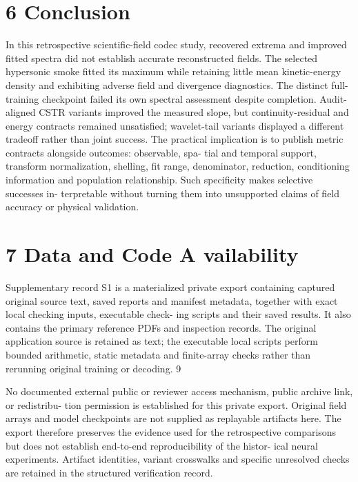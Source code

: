 \documentclass[11pt]{article}
\begin{document}
\section*{6 Conclusion}

In this retrospective scientific-field codec study, recovered extrema and improved fitted spectra did
not establish accurate reconstructed fields. The selected hypersonic smoke fitted its maximum while
retaining little mean kinetic-energy density and exhibiting adverse field and divergence diagnostics.
The distinct full-training checkpoint failed its own spectral assessment despite completion. Audit-
aligned CSTR variants improved the measured slope, but continuity-residual and energy contracts
remained unsatisfied; wavelet-tail variants displayed a different tradeoff rather than joint success.
The practical implication is to publish metric contracts alongside outcomes: observable, spa-
tial and temporal support, transform normalization, shelling, fit range, denominator, reduction,
conditioning information and population relationship. Such specificity makes selective successes in-
terpretable without turning them into unsupported claims of field accuracy or physical validation.

\section*{7 Data and Code A vailability}

Supplementary record S1 is a materialized private export containing captured original source text,
saved reports and manifest metadata, together with exact local checking inputs, executable check-
ing scripts and their saved results. It also contains the primary reference PDFs and inspection
records. The original application source is retained as text; the executable local scripts perform
bounded arithmetic, static metadata and finite-array checks rather than rerunning original training
or decoding.
9

No documented external public or reviewer access mechanism, public archive link, or redistribu-
tion permission is established for this private export. Original field arrays and model checkpoints
are not supplied as replayable artifacts here. The export therefore preserves the evidence used
for the retrospective comparisons but does not establish end-to-end reproducibility of the histor-
ical neural experiments. Artifact identities, variant crosswalks and specific unresolved checks are
retained in the structured verification record.
\end{document}
